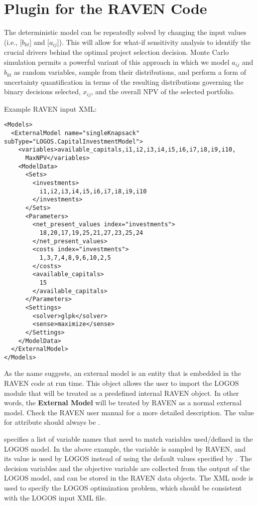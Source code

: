 \section{Plugin for the RAVEN Code}
\label{sec:RavenPlugin}

The deterministic model can be repeatedly solved by changing the input values (i.e.,
 [$b_{kt}$] and  [$a_{ij}$]).
This will allow for what-if sensitivity analysis to identify the
crucial drivers behind the optimal project selection decision. Monte Carlo simulation permits a
powerful variant of this approach in which we model $a_{ij}$ and $b_{kt}$ as random
variables, sample from their distributions, and perform a form of uncertainty quantification
in terms of the resulting distributions governing the binary decisions selected, $x_{ij}$, and
the overall NPV of the selected portfolio.

Example RAVEN input  XML:
\begin{lstlisting}[style=XML]
<Models>
  <ExternalModel name="singleKnapsack" subType="LOGOS.CapitalInvestmentModel">
    <variables>available_capitals,i1,i2,i3,i4,i5,i6,i7,i8,i9,i10,
      MaxNPV</variables>
    <ModelData>
      <Sets>
        <investments>
          i1,i2,i3,i4,i5,i6,i7,i8,i9,i10
        </investments>
      </Sets>
      <Parameters>
        <net_present_values index="investments">
          18,20,17,19,25,21,27,23,25,24
        </net_present_values>
        <costs index="investments">
          1,3,7,4,8,9,6,10,2,5
        </costs>
        <available_capitals>
          15
        </available_capitals>
      </Parameters>
      <Settings>
        <solver>glpk</solver>
        <sense>maximize</sense>
      </Settings>
    </ModelData>
  </ExternalModel>
</Models>
\end{lstlisting}

As the name suggests, an external model is an entity that is embedded in the RAVEN
code at run time. This object allows the user to import the LOGOS module that will
be treated as a predefined internal RAVEN object. In other words, the
\textbf{External Model} will be treated by RAVEN as a normal external model.
Check the RAVEN user manual for a more detailed description.
\nb The value for attribute  should always be .

 specifies a list of variable names that need to match
variables used/defined in the LOGOS model. In the above example, the variable
 is sampled by RAVEN, and its value is used
by LOGOS instead of using the default values specified by .
The decision variables  and the
objective variable  are collected from the output of the LOGOS model,
and can be stored in the RAVEN data objects.
The XML node  is used to specify the LOGOS optimization problem, which
should be consistent with the LOGOS input XML file.

